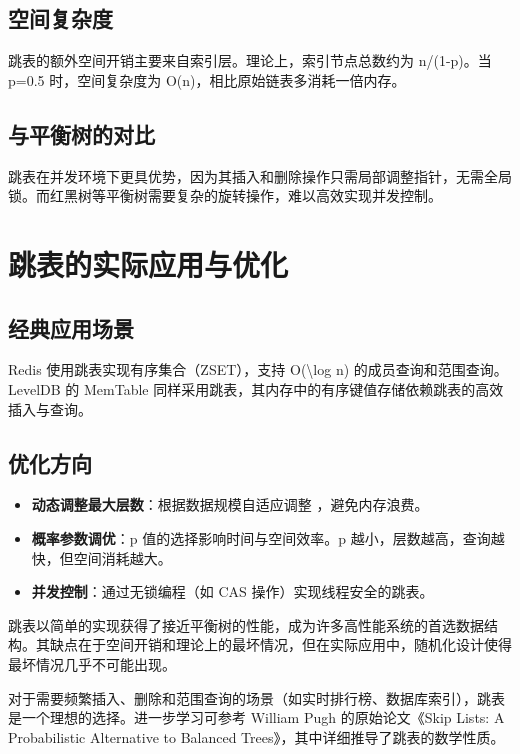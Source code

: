 \section{空间复杂度}
跳表的额外空间开销主要来自索引层。理论上，索引节点总数约为 n/(1-p)。当 p=0.5 时，空间复杂度为 O(n)，相比原始链表多消耗一倍内存。\par
\section{与平衡树的对比}
跳表在并发环境下更具优势，因为其插入和删除操作只需局部调整指针，无需全局锁。而红黑树等平衡树需要复杂的旋转操作，难以高效实现并发控制。\par
\chapter{跳表的实际应用与优化}
\section{经典应用场景}
Redis 使用跳表实现有序集合（ZSET），支持 O(\textbackslash{}log n) 的成员查询和范围查询。LevelDB 的 MemTable 同样采用跳表，其内存中的有序键值存储依赖跳表的高效插入与查询。\par
\section{优化方向}
\begin{itemize}
\item \textbf{动态调整最大层数}：根据数据规模自适应调整 ，避免内存浪费。
\item \textbf{概率参数调优}：p 值的选择影响时间与空间效率。p 越小，层数越高，查询越快，但空间消耗越大。
\item \textbf{并发控制}：通过无锁编程（如 CAS 操作）实现线程安全的跳表。
\end{itemize}
跳表以简单的实现获得了接近平衡树的性能，成为许多高性能系统的首选数据结构。其缺点在于空间开销和理论上的最坏情况，但在实际应用中，随机化设计使得最坏情况几乎不可能出现。\par
对于需要频繁插入、删除和范围查询的场景（如实时排行榜、数据库索引），跳表是一个理想的选择。进一步学习可参考 William Pugh 的原始论文《Skip Lists: A Probabilistic Alternative to Balanced Trees》，其中详细推导了跳表的数学性质。\par
